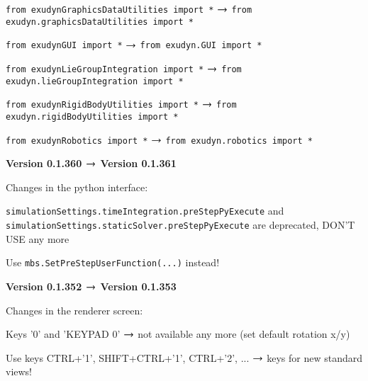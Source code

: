 	  \item \texttt{from exudynGraphicsDataUtilities import *} $\rightarrow$ \texttt{from exudyn.graphicsDataUtilities import *}
	  \item \texttt{from exudynGUI import *} $\rightarrow$ \texttt{from exudyn.GUI import *}
	  \item \texttt{from exudynLieGroupIntegration import *} $\rightarrow$ \texttt{from exudyn.lieGroupIntegration import *}
	  \item \texttt{from exudynRigidBodyUtilities import *} $\rightarrow$ \texttt{from exudyn.rigidBodyUtilities import *}
	  \item \texttt{from exudynRobotics import *} $\rightarrow$ \texttt{from exudyn.robotics import *}
	\ei
	\item {\bf Version 0.1.360 $\rightarrow$ Version 0.1.361}
	\item[] Changes in the python interface:
	\bi \ttfamily
	  \item \texttt{simulationSettings.timeIntegration.preStepPyExecute} and \\
		\texttt{simulationSettings.staticSolver.preStepPyExecute}
		are deprecated, DON'T USE any more
	  \item Use \texttt{mbs.SetPreStepUserFunction(...)} instead!
	\ei
	\item {\bf Version 0.1.352 $\rightarrow$ Version 0.1.353}
	\item[] Changes in the renderer screen:
	\bi \ttfamily
	  \item Keys '0' and 'KEYPAD 0' $\rightarrow$ not available any more (set default rotation x/y)
	  \item Use keys CTRL+'1', SHIFT+CTRL+'1', CTRL+'2', ...  $\rightarrow$ keys for new standard views!
	\ei

